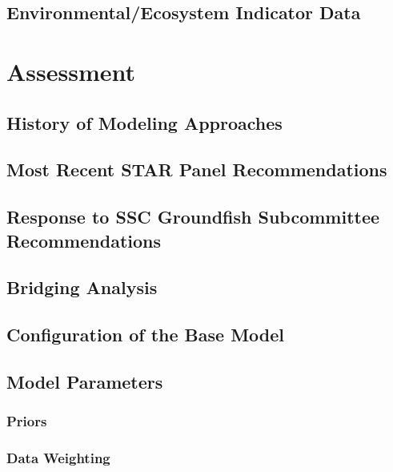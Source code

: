 \documentclass[
]{scrartcl}
\begin{document}
\subsection{Environmental/Ecosystem Indicator
Data}\label{environmentalecosystem-indicator-data}

\newpage{}

\section{Assessment}\label{assessment}

\subsection{History of Modeling
Approaches}\label{history-of-modeling-approaches}

\subsection{Most Recent STAR Panel
Recommendations}\label{most-recent-star-panel-recommendations}

\subsection{Response to SSC Groundfish Subcommittee
Recommendations}\label{response-to-ssc-groundfish-subcommittee-recommendations}

\subsection{Bridging Analysis}\label{bridging-analysis}

\subsection{Configuration of the Base
Model}\label{configuration-of-the-base-model}

\subsection{Model Parameters}\label{model-parameters}

\subsubsection{Priors}\label{priors}

\subsubsection{Data Weighting}\label{data-weighting}
\end{document}
